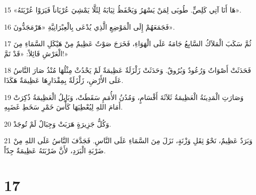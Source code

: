 \par 15 «هَا أَنَا آتِي كَلِصٍّ. طُوبَى لِمَنْ يَسْهَرُ وَيَحْفَظُ ثِيَابَهُ لِئَلَّا يَمْشِيَ عُرْيَاناً فَيَرَوْا عُرْيَتَهُ».
\par 16 فَجَمَعَهُمْ إِلَى الْمَوْضِعِ الَّذِي يُدْعَى بِالْعِبْرَانِيَّةِ «هَرْمَجَدُّونَ».
\par 17 ثُمَّ سَكَبَ الْمَلاَكُ السَّابِعُ جَامَهُ عَلَى الْهَوَاءِ، فَخَرَجَ صَوْتٌ عَظِيمٌ مِنْ هَيْكَلِ السَّمَاءِ مِنَ الْعَرْشِ قَائِلاً: «قَدْ تَمَّ!»
\par 18 فَحَدَثَتْ أَصْوَاتٌ وَرُعُودٌ وَبُرُوقٌ. وَحَدَثَتْ زَلْزَلَةٌ عَظِيمَةٌ لَمْ يَحْدُثْ مِثْلُهَا مُنْذُ صَارَ النَّاسُ عَلَى الأَرْضِ، زَلْزَلَةٌ بِمِقْدَارِهَا عَظِيمَةٌ هَكَذَا.
\par 19 وَصَارَتِ الْمَدِينَةُ الْعَظِيمَةُ ثَلاَثَةَ أَقْسَامٍ، وَمُدُنُ الأُمَمِ سَقَطَتْ، وَبَابِلُ الْعَظِيمَةُ ذُكِرَتْ أَمَامَ اللهِ لِيُعْطِيَهَا كَأْسَ خَمْرِ سَخَطِ غَضَبِهِ.
\par 20 وَكُلُّ جَزِيرَةٍ هَرَبَتْ وَجِبَالٌ لَمْ تُوجَدْ.
\par 21 وَبَرَدٌ عَظِيمٌ، نَحْوُ ثِقَلِ وَزْنَةٍ، نَزَلَ مِنَ السَّمَاءِ عَلَى النَّاسِ. فَجَدَّفَ النَّاسُ عَلَى اللهِ مِنْ ضَرْبَةِ الْبَرَدِ، لأَنَّ ضَرْبَتَهُ عَظِيمَةٌ جِدّاً.

\chapter{17}

